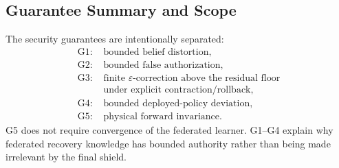 \subsection{Guarantee Summary and Scope}
The security guarantees are intentionally separated:
\begin{align}
\text{G1: }&\text{bounded belief distortion},\\
\text{G2: }&\text{bounded false authorization},\\
\text{G3: }&\text{finite $\varepsilon$-correction above the residual floor} \nonumber\\
&\text{under explicit contraction/rollback},\\
\text{G4: }&\text{bounded deployed-policy deviation},\\
\text{G5: }&\text{physical forward invariance}.
\end{align}
G5 does not require convergence of the federated learner. G1--G4 explain why federated recovery knowledge has bounded authority rather than being made irrelevant by the final shield.
